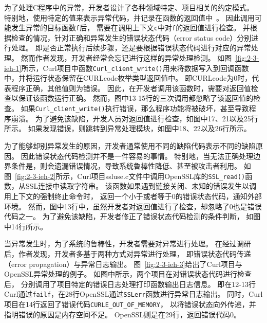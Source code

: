 

为了处理C程序中的异常，开发者设计了各种领域特定、项目相关的约定模式。
特别地，使用特定的值来表示异常代码，并记录在函数的返回值中~\cite{08-fast-eio}。
因此调用可能发生异常的目标函数\texttt{f}后，
需要在调用上下文\texttt{c}中对\texttt{f}的返回值进行检查。
并根据检查的情况，针对正确和异常发生的错误状态代码（error status code）分别进行处理。
即是否正常执行后续步骤，还是要根据错误状态代码进行对应的异常处理。
然而作者发现，开发者经常会忘记进行这样的异常处理检测。
如图~\ref{fig:2-3-ieh-1}所示，Curl项目中函数\texttt{Curl\_client\_write()}用来将数据写入到回调函数中，并将运行状态保留在CURLcode枚举类型返回值中。
即CURLcode为0时，代表程序正确，其他值则为错误。
因此，在开发者调用该函数时，需要对返回值检查以保证该函数运行正确。
然而，图中13-15行的三次调用都忽略了该返回值的检查。
如果\texttt{Curl\_client\_write()}执行错误，那么程序功能将被破坏，甚至导致程序崩溃。
为了避免该缺陷，开发人员对返回值进行检查，如图中17、21以及25行所示。
如果发现错误，则跳转到异常处理模块，如图中18、22以及26行所示。



为了能够却别异常发生的原因，开发者通常使用不同的缺陷代码表示不同的缺陷原因。
因此错误状态代码检测并不是一件容易的事情。
特别地，当无法正确处理边界条件是，则会遗漏错误情况，导致系统鲁棒性降低、甚至被攻击者利用。
如图~\ref{fig:2-3-ieh-2}所示，Curl项目ssluse.c文件中调用OpenSSL库的\texttt{SSL\_read()}函数，从SSL连接中读取字符串。
该函数如果遇到链接关闭、未知的错误发生以调用上下文的强制终止命令时，
返回一个小于或者等于0的错误状态代码，通知外部环境。
然而，图中13行中，虽然开发者对返回值进行了检查，却忽略了0也是错误代码之一。
为了避免该缺陷，开发者修正了错误状态代码检测的条件判断，
如图中14行所示。



当异常发生时，为了系统的鲁棒性，开发者需要对异常进行处理。
在经过调研后，作者发现，开发者多基于两种方式对异常进行处理，
即错误状态代码传递（error propagation）与异常日志输出。
图~\ref{fig:2-3-ieh-3}给出了Curl项目与OpenSSL异常处理的例子。
如图中所示，两个项目在对错误状态代码进行检查后，
分别调用了项目特定的错误日志处理打印函数输出日志信息。
即在12-13行Curl通过\texttt{failf}，在28行OpenSSL通过\texttt{SSLerr}函数进行异常日志输出。
同时，Curl项目在14行返回了错误代码\texttt{CURLE\_OUT\_OF\_MEMORY}，
以将错误状态向外传递，并指明错误的原因是内存空间不足。
OpenSSL则是在29行，返回错误代码0。

\vspace*{10pt}
\begin{center}
	\noindent{}
\end{center}

